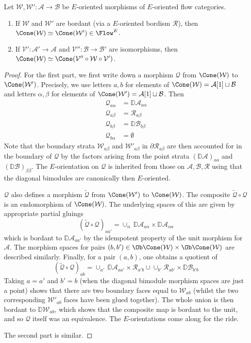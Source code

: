 \documentclass{TPmod}
\def\bD{\mathbb{D}}
\newcommand{\cA}{\mathcal{A}}
\newcommand{\cB}{\mathcal{B}}
\newcommand{\cQ}{\mathcal{Q}}
\newcommand{\cR}{\mathcal{R}}
\newcommand{\cV}{\mathcal{V}}
\newcommand{\cW}{\mathcal{W}}
\renewcommand{\cong}{\simeq}
\numberwithin{equation}{section}
\begin{document}
    \begin{prop}\label{prop: cone prop}
        Let $\cW, \cW': \cA \to \cB$ be $E$-oriented morphisms of $E$-oriented flow categories. 
        \begin{enumerate}
            \item If $\cW$ and $\cW'$ are bordant (via a $E$-oriented bordism $\cR$), then $\Cone(\cW) \cong \Cone(\cW') \in \Flow^{E}$.
            \item If $\cV': \cA' \to \cA$ and $\cV'': \cB \to \cB'$ are isomorphisms, then $\Cone(\cW) \cong \Cone(\cV'' \circ \cW \circ \cV')$.
        \end{enumerate}
    \end{prop}
    \begin{proof}
        For the first part, we first write down a morphism $\cQ$ from $
    \Cone(\cW)$ to $\Cone(\cW')$. Precisely, we use letters $a,b$ for elements of $\Cone(\cW) = \cA[1] \sqcup \cB$ and letters $\alpha,\beta$ for elements of $\Cone(\cW') = \cA[1] \sqcup \cB$. Then
    \begin{align*}
    \cQ_{a\alpha} & =  \bD\cA_{a\alpha}\\
    \cQ_{a\beta} & =  \cR_{a\beta} \\
    \cQ_{b\beta} & =  \bD \cB_{b\beta} \\
    \cQ_{b\alpha} & = \emptyset
    \end{align*}
    Note that the boundary strata $\cW_{a\beta}$ and $\cW'_{a\beta}$ in $\partial \cR_{a\beta}$ are then accounted for in the boundary of $\cQ$ by the factors arising from the point strata $(\bD\cA)_{aa}$ and $(\bD\cB)_{\beta\beta}$. The $E$-orientation on $\cQ$ is inherited from those on $\cA,\cB,\cR$ using that the diagonal bimodules are canonically then $E$-oriented.

    $\cQ$ also defines a morphism $\tilde{\cQ}$ from $\Cone(\cW')$ to $\Cone(\cW)$. The composite $\tilde{\cQ} \circ \cQ$ is an endomorphism of $\Cone(\cW)$. The underlying spaces of this are given by appropriate partial gluings 
    \[
    (\tilde{\cQ} \circ \cQ)_{aa'} = \cup_{\alpha} \, \bD\cA_{a\alpha} \times \bD\cA_{\alpha a} 
    \]
which is bordant to $\bD\cA_{aa'}$ by the idempotent property of the unit morphism for $\cA$. The morphism spaces for pairs $(b,b') \in \Ob\Cone(\cW)\times \Ob\Cone(\cW)$ are described similarly. Finally, for a pair $(a,b)$, one obtains a quotient of 
\[
    (\tilde{\cQ} \circ \cQ)_{ab} = \cup_{a'} \, \bD\cA_{aa'} \times \cR_{a'b} \cup \cup_{b'} \cR_{ab'} \times \bD\cB_{b'b} 
    \]
    Taking $a=a'$ and $b'=b$ (when the diagonal bimodule morphism spaces are just a point) shows that there are two boundary faces equal to $\cW_{ab}$ (whilst the two corresponding $\cW'_{ab}$ faces have been glued together). The whole union is then bordant to $\bD\cW_{ab}$, which shows that the composite map is bordant to the unit, and so $\cQ$ itself was an equivalence.  The $E$-orientations come along for the ride.  
    
The second part is similar.
    \end{proof}
\end{document}
